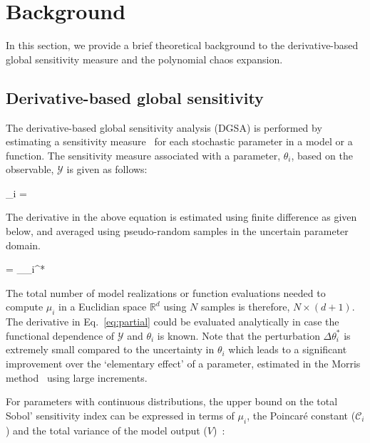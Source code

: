 \section{Background}
\label{sec:bg}

In this section, we provide a brief theoretical background to the
derivative-based global sensitivity measure and the polynomial chaos
expansion.

\subsection{Derivative-based global sensitivity}  

The derivative-based global sensitivity analysis (DGSA) is performed by 
estimating a sensitivity measure~\cite{Kucherenko:2009} for each stochastic
parameter in a model or a function. The
sensitivity measure associated with a parameter, $\theta_i$, based on
the observable, $\mathcal{Y}$ is given as follows:

\be
\mu_i = 
\label{eq:mu}
\ee

The derivative in the above equation is estimated using finite
difference as given below, and averaged using pseudo-random samples in
the uncertain parameter domain. 

\be
{} =
 \lim_{\Delta\theta_i^{*}}
\label{eq:partial}
\ee

The total number of model realizations or function evaluations
needed to
compute $\mu_i$ in a Euclidian space $\mathbb{R}^d$ using $N$ samples is
therefore, $N\times(d+1)$. The derivative in Eq.~\ref{eq:partial} could be evaluated
analytically in case the functional dependence of $\mathcal{Y}$ and $\theta_i$
is known. Note that the perturbation $\Delta\theta_i^{*}$ is extremely small 
compared to the uncertainty in $\theta_i$ which leads to a significant improvement
over the `elementary effect' of a parameter, estimated in the Morris method~\cite{Morris:1991}
using large increments. 

For parameters with continuous distributions, the upper bound on the total Sobol' sensitivity index
can be expressed in terms of $\mu_i$, the Poincar\'e constant ($\mathcal{C}_i$) and the total 
variance of the model output ($V$)~\cite{Lamboni:2013}:

